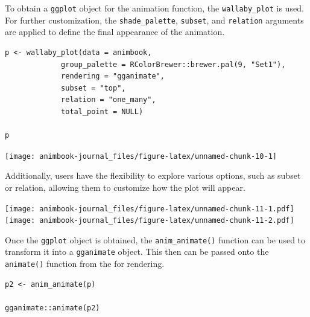 To obtain a \texttt{ggplot} object for the animation function, the \texttt{wallaby\_plot} is used. For further customization, the \texttt{shade\_palette}, \texttt{subset}, and \texttt{relation} arguments are applied to define the final appearance of the animation.

\begin{verbatim}
p <- wallaby_plot(data = animbook,
             group_palette = RColorBrewer::brewer.pal(9, "Set1"),
             rendering = "gganimate",
             subset = "top",
             relation = "one_many",
             total_point = NULL)

p
\end{verbatim}

\begin{center}\texttt{[image: animbook-journal\_files/figure-latex/unnamed-chunk-10-1]} \end{center}

Additionally, users have the flexibility to explore various options, such as subset or relation, allowing them to customize how the plot will appear.

\texttt{[image: animbook-journal\_files/figure-latex/unnamed-chunk-11-1.pdf]} \texttt{[image: animbook-journal\_files/figure-latex/unnamed-chunk-11-2.pdf]}

Once the \texttt{ggplot} object is obtained, the \texttt{anim\_animate()} function can be used to transform it into a \texttt{gganimate} object. This then can be passed onto the \texttt{animate()} function from the  for rendering.

\begin{verbatim}
p2 <- anim_animate(p)

gganimate::animate(p2)
\end{verbatim}

